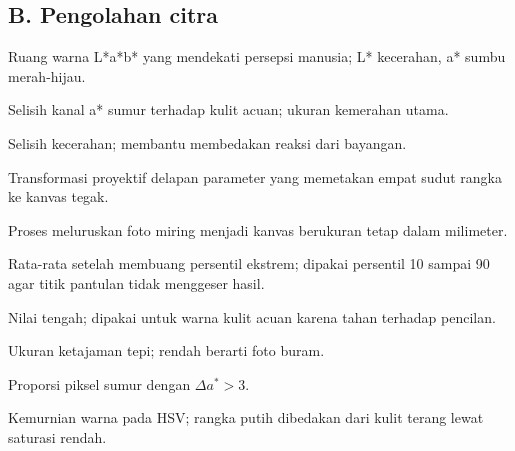 \documentclass[11pt,a4paper]{article}
\begin{document}
\subsection*{B. Pengolahan citra}
\begin{description}[style=nextline,itemsep=1pt]
\item[CIELAB] Ruang warna L*a*b* yang mendekati persepsi manusia; L* kecerahan,
a* sumbu merah-hijau.
\item[$\Delta a^*$] Selisih kanal a* sumur terhadap kulit acuan; ukuran
kemerahan utama.
\item[$\Delta L^*$] Selisih kecerahan; membantu membedakan reaksi dari bayangan.
\item[Homografi] Transformasi proyektif delapan parameter yang memetakan empat
sudut rangka ke kanvas tegak.
\item[Rektifikasi] Proses meluruskan foto miring menjadi kanvas berukuran tetap
dalam milimeter.
\item[Rerata terpangkas] Rata-rata setelah membuang persentil ekstrem; dipakai
persentil 10 sampai 90 agar titik pantulan tidak menggeser hasil.
\item[Median] Nilai tengah; dipakai untuk warna kulit acuan karena tahan terhadap
pencilan.
\item[Varians Laplacian] Ukuran ketajaman tepi; rendah berarti foto buram.
\item[Fraksi piksel merah] Proporsi piksel sumur dengan $\Delta a^*>3$.
\item[Saturasi] Kemurnian warna pada HSV; rangka putih dibedakan dari kulit
terang lewat saturasi rendah.
\end{description}
\end{document}
